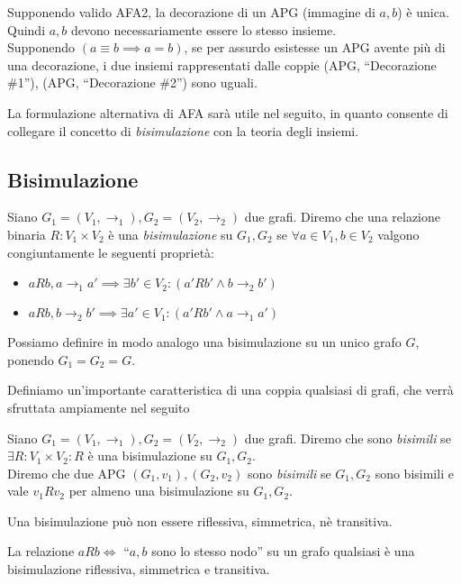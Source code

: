 \begin{proof2}
    Supponendo valido AFA2, la decorazione di un APG (immagine di $a,b$) è unica. Quindi $a,b$ devono necessariamente essere lo stesso insieme.\\
    Supponendo $(a \equiv b \implies a = b)$, se per assurdo esistesse un APG avente più di una decorazione, i due insiemi rappresentati dalle coppie (APG, ``Decorazione \#1''), (APG, ``Decorazione \#2'') sono uguali.
\end{proof2}
La formulazione alternativa di AFA sarà utile nel seguito, in quanto consente di collegare il concetto di \emph{bisimulazione} con la teoria degli insiemi.

\subsection{Bisimulazione}
\begin{definition}
    Siano $G_1 = (V_1,\to_1), G_2 = (V_2,\to_2)$ due grafi. Diremo che una relazione binaria $R: V_1 \times V_2$ è una \emph{bisimulazione} su $G_1, G_2$ se $\forall a \in V_1, b \in V_2$ valgono congiuntamente le seguenti proprietà:
    \begin{itemize}
        \item $a R b, a \to_1 a' \implies \exists b' \in V_2 : (a' R b' \land b \to_2 b')$
        \item $a R b, b \to_2 b' \implies \exists a' \in V_1 : (a' R b' \land a \to_1 a')$
    \end{itemize}
    Possiamo definire in modo analogo una bisimulazione su un unico grafo $G$, ponendo $G_1 = G_2 = G$.
\end{definition}
Definiamo un'importante caratteristica di una coppia qualsiasi di grafi, che verrà sfruttata ampiamente nel seguito
\begin{definition}
    Siano $G_1 = (V_1,\to_1), G_2 = (V_2,\to_2)$ due grafi. Diremo che sono \emph{bisimili} se $\exists R: V_1 \times V_2 : R$ è una bisimulazione su $G_1, G_2$.\\
    Diremo che due APG $(G_1, v_1), (G_2, v_2)$ sono \emph{bisimili} se $G_1, G_2$ sono bisimili e vale $v_1 R v_2$ per almeno una bisimulazione su $G_1, G_2$.
\end{definition}
\begin{observation}
    Una bisimulazione può non essere riflessiva, simmetrica, nè transitiva.
\end{observation}
\begin{example}
    La relazione $a R b \iff$ ``$a,b$ sono lo stesso nodo'' su un grafo qualsiasi è una bisimulazione riflessiva, simmetrica e transitiva.
\end{example}
